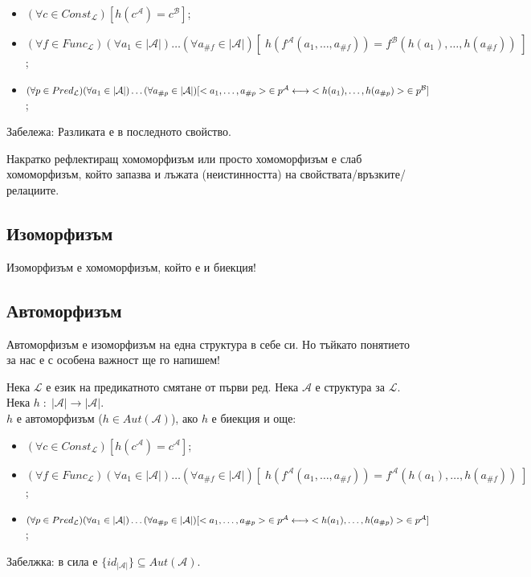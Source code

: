 \documentclass{article}[12pt]
\newcommand{\Lang}{\mathcal{L}}
\begin{document}
\begin{itemize}
\item \((\forall c \in Const_\Lang)[h(c^\mathcal{A}) = c^\mathcal{B}]\);
\item \((\forall f \in Func_\Lang)(\forall a_1 \in |\mathcal{A}|)\dots(\forall a_{\#f} \in |\mathcal{A}|)
[\; h(f^\mathcal{A}(a_1, \dots, a_{\#f})) = f^\mathcal{B}(h(a_1), \dots, h(a_{\#f}))\;]\);
\item \((\forall p \in Pred_\Lang)(\forall a_1 \in |\mathcal{A}|)\dots(\forall a_{\#p} \in |\mathcal{A}|) \newline
[<a_1, \dots, a_{\#p}> \; \in p^\mathcal{A} \longleftrightarrow \; <h(a_1), \dots, h(a_{\#p})> \; \in p^\mathcal{B}]\);
\end{itemize}

Забележа: Разликата е в последното свойство.

Накратко рефлектиращ хомоморфизъм или просто хомоморфизъм е слаб хомоморфизъм,
който запазва и лъжата (неистинността) на свойствата/връзките/релациите.

\subsection{Изоморфизъм}

Изоморфизъм е хомоморфизъм, който е и биекция!

\subsection{Автоморфизъм}

Автоморфизъм е изоморфизъм на една структура в себе си.
Но тъйкато понятието за нас е с особена важност ще го напишем!

\vspace{1cm}

Нека \(\Lang\) е език на предикатното смятане от първи ред.
Нека \(\mathcal{A}\) е структура за \(\Lang\).
Нека \(h \; : \; |\mathcal{A}| \to |\mathcal{A}|\). \\
\(h\) е автоморфизъм (\(h \in Aut(\mathcal{A})\)),
ако \(h\) е биекция и още:

\begin{itemize}
\item \((\forall c \in Const_\Lang)[h(c^\mathcal{A}) = c^\mathcal{A}]\);
\item \((\forall f \in Func_\Lang)(\forall a_1 \in |\mathcal{A}|)\dots(\forall a_{\#f} \in |\mathcal{A}|)
[\; h(f^\mathcal{A}(a_1, \dots, a_{\#f})) = f^\mathcal{A}(h(a_1), \dots, h(a_{\#f}))\;]\);
\item \((\forall p \in Pred_\Lang)(\forall a_1 \in |\mathcal{A}|)\dots(\forall a_{\#p} \in |\mathcal{A}|) \newline
[<a_1, \dots, a_{\#p}> \; \in p^\mathcal{A} \longleftrightarrow \; <h(a_1), \dots, h(a_{\#p})> \; \in p^\mathcal{A}]\);
\end{itemize}

Забелжка: в сила е \(\{id_{|\mathcal{A}|}\} \subseteq Aut(\mathcal{A})\).
\end{document}

